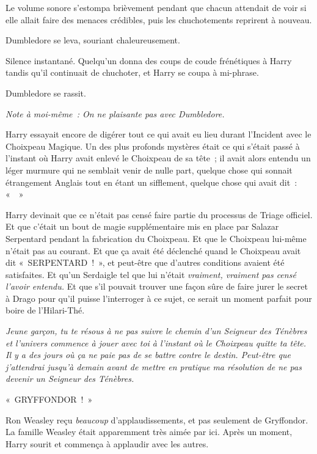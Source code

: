 Le volume sonore s'estompa brièvement pendant que chacun attendait de voir si elle allait faire des menaces crédibles, puis les chuchotements reprirent à nouveau.

Dumbledore se leva, souriant chaleureusement.

Silence instantané. Quelqu'un donna des coups de coude frénétiques à Harry tandis qu'il continuait de chuchoter, et Harry se coupa à mi-phrase.

Dumbledore se rassit.

\emph{Note à moi-même~: On ne plaisante pas avec Dumbledore.}

Harry essayait encore de digérer tout ce qui avait eu lieu durant l'Incident avec le Choixpeau Magique. Un des plus profonds mystères était ce qui s'était passé à l'instant où Harry avait enlevé le Choixpeau de sa tête~; il avait alors entendu un léger murmure qui ne semblait venir de nulle part, quelque chose qui sonnait étrangement Anglais tout en étant un sifflement, quelque chose qui avait dit~: «~~»

Harry devinait que ce n'était pas censé faire partie du processus de Triage officiel. Et que c'était un bout de magie supplémentaire mis en place par Salazar Serpentard pendant la fabrication du Choixpeau. Et que le Choixpeau lui-même n'était pas au courant. Et que ça avait été déclenché quand le Choixpeau avait dit «~SERPENTARD~!~», et peut-être que d'autres conditions avaient été satisfaites. Et qu'un Serdaigle tel que lui n'était \emph{vraiment, vraiment pas censé l'avoir entendu.} Et que s'il pouvait trouver une façon sûre de faire jurer le secret à Drago pour qu'il puisse l'interroger à ce sujet, ce serait un moment parfait pour boire de l'Hilari-Thé.

\emph{Jeune garçon, tu te résous à ne pas suivre le chemin d'un Seigneur des Ténèbres et l'univers commence à jouer avec toi à l'instant où le Choixpeau quitte ta tête. Il y a des jours où ça ne paie pas de se battre contre le destin. Peut-être que j'attendrai jusqu'à demain avant de mettre en pratique ma résolution de ne pas devenir un Seigneur des Ténèbres.}

«~GRYFFONDOR~!~»

Ron Weasley reçu \emph{beaucoup} d'applaudissements, et pas seulement de Gryffondor. La famille Weasley était apparemment très aimée par ici. Après un moment, Harry sourit et commença à applaudir avec les autres.

